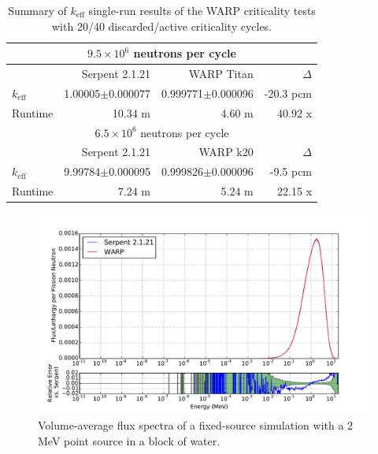 \documentclass[preprint,12pt]{elsarticle}
\begin{document}
\begin{table}[h]
\centering
\caption{Summary of $k_\mathrm{eff}$ single-run results of the WARP criticality tests with 20/40 discarded/active criticality cycles.}
\label{jezebel_table}
\small
\begin{tabular}{| l | r | r | r |}
\hline
\multicolumn{4}{|c|}{$9.5\times10^6$ neutrons per cycle} \\
\hline
                  & Serpent 2.1.21        & WARP Titan                & $\Delta$ \\
\hline
$k_\mathrm{eff}$  & 1.00005$\pm$0.000077 & 0.999771$\pm$0.000096     & -20.3 pcm \\
\hline
Runtime           & 10.34 m              & 4.60 m                    & 40.92 x \\
\hline
\hline
\multicolumn{4}{|c|}{$6.5\times10^6$ neutrons per cycle} \\
\hline
                  & Serpent 2.1.21       & WARP k20            & $\Delta$ \\
\hline
$k_\mathrm{eff}$  & 9.99784$\pm$0.000095 & 0.999826$\pm$0.000096    & -9.5 pcm \\
\hline
Runtime           & 7.24 m             & 5.24 m              & 22.15 x\\
\hline
\end{tabular}
\end{table}

\begin{figure}[h!]
\centering
\includegraphics[width=\textwidth,trim= 1cm 0cm 1cm 0cm]{graphics/jezebel_spec.pdf}
\caption{Volume-average flux spectra of a fixed-source simulation with a 2 MeV point source in a block of water. \label{jezebel_spec} }
\end{figure}
\end{document}

